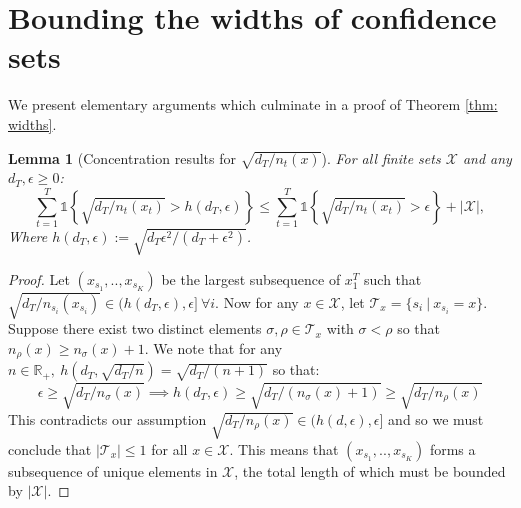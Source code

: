 \documentclass{article}
\newtheorem{lemma}{Lemma}
\newcommand{\Real}{\mathds{R}}
\newcommand{\Ind}{\mathds{1}}
\newcommand{\Xc}{\mathcal{X}}
\begin{document}
\newpage
\small{


}
\newpage




\appendix
\section{Bounding the widths of confidence sets}
\label{sec: widths}
We present elementary arguments which culminate in a proof of Theorem \ref{thm: widths}.

\begin{lemma}[Concentration results for $\sqrt{d_T / n_t(x)}$]
\label{lem: rad} \hspace{0.000000001mm} \newline
For all finite sets $\Xc$ and any $d_T, \epsilon \ge 0$:
$$\sum_{t=1}^T \Ind \left\{ \sqrt{ d_T / n_t(x_t) } > h(d_T,\epsilon) \right\} \le
	\sum_{t=1}^T \Ind \left\{ \sqrt{ d_T/n_t(x_t) } > \epsilon \right\} + |\Xc|,$$
Where $h(d_T, \epsilon) := \sqrt{d_T \epsilon^2 / (d_T + \epsilon^2)}$.
\end{lemma}
\begin{proof}
Let $(x_{s_1},..,x_{s_K})$ be the largest subsequence of $x^T_1$ such that $\sqrt{d_T / n_{s_i}(x_{s_i})}\in ( h(d_T,\epsilon), \epsilon] \ \forall i$.
Now for any $x \in \Xc$, let $\mathcal{T}_x = \{ s_i \ | \ x_{s_i} = x \}$.
Suppose there exist two distinct elements $\sigma, \rho \in \mathcal{T}_x$ with $\sigma < \rho$ so that $n_\rho(x) \ge n_\sigma(x) + 1$.
We note that for any $n \in \Real_+, \  h(d_T, \sqrt{d_T / n}) = \sqrt{d_T / (n+1)}$ so that:
$$ \epsilon \ge \sqrt{ d_T / n_\sigma(x) } \implies h(d_T, \epsilon) \ge \sqrt{ d_T / (n_\sigma(x) + 1) } \ge \sqrt{ d_T / n_\rho(x) } $$
This contradicts our assumption $\sqrt{d_T / n_\rho(x)} \in ( h(d,\epsilon), \epsilon]$ and so we must conclude that $| \mathcal{T}_x| \le 1$ for all $ x \in \Xc$.
This means that $(x_{s_1},..,x_{s_K})$ forms a subsequence of unique elements in $\Xc$, the total length of which must be bounded by $| \Xc | $.
\end{proof}
\end{document}
